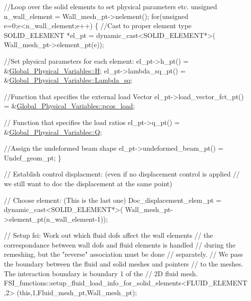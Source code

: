 \begin{DoxyCodeInclude}
{ 
 \textcolor{comment}{//Loop over the solid elements to set physical parameters etc.}
 \textcolor{keywordtype}{unsigned} n\_wall\_element = Wall\_mesh\_pt->nelement();
 \textcolor{keywordflow}{for}(\textcolor{keywordtype}{unsigned} e=0;e<n\_wall\_element;e++)
  \{
   \textcolor{comment}{//Cast to proper element type}
   SOLID\_ELEMENT *el\_pt = \textcolor{keyword}{dynamic\_cast<}SOLID\_ELEMENT*\textcolor{keyword}{>}(
    Wall\_mesh\_pt->element\_pt(e));
   
   \textcolor{comment}{//Set physical parameters for each element:}
   el\_pt->h\_pt() = &\hyperlink{namespaceGlobal__Physical__Variables_af6e07423e22c0991084d9a2f43727805}{Global\_Physical\_Variables::H};
   el\_pt->lambda\_sq\_pt() = &\hyperlink{namespaceGlobal__Physical__Variables_a6fe17557ceb32dd353827fba60408363}{Global\_Physical\_Variables::Lambda\_sq};
   
   \textcolor{comment}{//Function that specifies the external load Vector}
   el\_pt->load\_vector\_fct\_pt() = &\hyperlink{namespaceGlobal__Physical__Variables_aa08c246eac99f59be33ef4a6ee924990}{Global\_Physical\_Variables::pcos\_load};

   \textcolor{comment}{// Function that specifies the load ratios}
   el\_pt->q\_pt() = &\hyperlink{namespaceGlobal__Physical__Variables_a66cb7ecda9ba0cd72367dd697f154545}{Global\_Physical\_Variables::Q};

   \textcolor{comment}{//Assign the undeformed beam shape}
   el\_pt->undeformed\_beam\_pt() = Undef\_geom\_pt;
  \}
 
 \textcolor{comment}{// Establish control displacment: (even if no displacement control is applied}
 \textcolor{comment}{// we still want to doc the displacement at the same point)}

 \textcolor{comment}{// Choose element: (This is the last one)}
 Doc\_displacement\_elem\_pt = \textcolor{keyword}{dynamic\_cast<}SOLID\_ELEMENT*\textcolor{keyword}{>}(
  Wall\_mesh\_pt->element\_pt(n\_wall\_element-1));
  
 \textcolor{comment}{// Setup fsi: Work out which fluid dofs affect the wall elements}
 \textcolor{comment}{// the correspondance between wall dofs and fluid elements is handled}
 \textcolor{comment}{// during the remeshing, but the "reverse" association must be done}
 \textcolor{comment}{// separately.}
 \textcolor{comment}{// We pass the boundary between the fluid and solid meshes and pointers}
 \textcolor{comment}{// to the meshes. The interaction boundary is boundary 1 of the }
 \textcolor{comment}{// 2D fluid mesh.}
 FSI\_functions::setup\_fluid\_load\_info\_for\_solid\_elements<FLUID\_ELEMENT,2>
  (\textcolor{keyword}{this},1,Fluid\_mesh\_pt,Wall\_mesh\_pt);

}
\end{DoxyCodeInclude}
